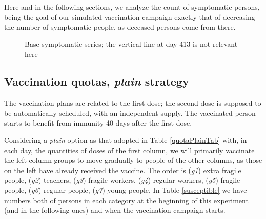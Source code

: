 \documentclass[graybox]{svmult}
\begin{document}
Here and in the following sections, we analyze the count of symptomatic persons, being the goal of our simulated vaccination campaign exactly that of decreasing the number of symptomatic people, as deceased persons come from there.

\begin{figure}[t]
\center
{}
\caption{Base symptomatic series; the vertical line at day 413 is not relevant here} 
\label{symptomaticSeries}
\end{figure}


\subsection{Vaccination quotas, \emph{plain} strategy}
\label{plain}

The vaccination plans are related to the first dose; the second dose is supposed to be automatically scheduled, with an independent supply. The vaccinated person starts to benefit from immunity 40 days after the first dose.

Considering a \emph{plain} option as that adopted in Table \ref{quotaPlainTab} with, in each day, the quantities of doses of the first column, we will primarily vaccinate the left column groups to move gradually to people of the other columns, as those on the left have already received the vaccine. The order is (\emph{g1}) extra fragile people, (\emph{g2}) teachers, (\emph{g3}) fragile workers, (\emph{g4}) regular workers, (\emph{g5}) fragile people, (\emph{g6}) regular people, (\emph{g7}) young people. In Table \ref{susceptible} we have numbers both of persons in each category at the beginning of this experiment (and in the following ones) and when the vaccination campaign starts.
\end{document}
